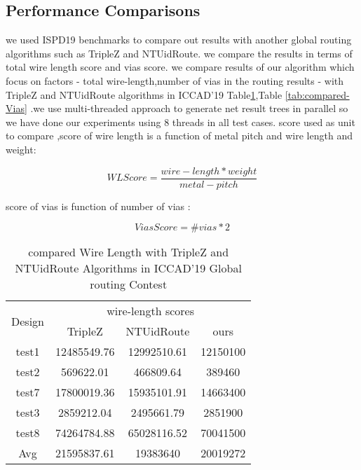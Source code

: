 \documentclass[conference]{IEEEtran}
\begin{document}
\subsection{Performance Comparisons}

we used ISPD19 benchmarks to compare out results with another global
routing algorithms such as TripleZ and NTUidRoute. we compare the
results in terms of total wire length score and vias score. we compare
results of our algorithm which focus on factors - total wire-length,number
of vias in the routing results - with TripleZ and NTUidRoute algorithms
in ICCAD'19 Table\ref{tab:compared-Wire-Lengh},Table \ref{tab:compared-Vias}
.we use multi-threaded approach to generate net result trees in parallel
so we have done our experiments using 8 threads in all test cases.
score used as unit to compare ,score of wire length is a function
of metal pitch and wire length and weight:

\[
WLScore=\frac{wire-length*weight}{metal-pitch}
\]

score of vias is function of number of vias :

\[
ViasScore=\#vias*2
\]

{\tiny{}}
\begin{table}
{\tiny{}\caption{\label{tab:compared-Wire-Lengh}compared Wire Length with TripleZ and
NTUidRoute Algorithms in ICCAD'19 Global routing Contest }
}{\tiny\par}
\centering{}{\footnotesize{}}%
\begin{tabular}{|c|c|c|c|}
\hline 
\multirow{2}{*}{{\footnotesize{}Design}} & \multicolumn{3}{c|}{{\footnotesize{}wire-length scores}}\tabularnewline
\cline{2-4} \cline{3-4} \cline{4-4} 
 & {\footnotesize{}TripleZ} & {\footnotesize{}NTUidRoute} & {\footnotesize{}ours}\tabularnewline
\hline 
{\footnotesize{}test1} & {\footnotesize{}12485549.76} & {\footnotesize{}12992510.61} & {\footnotesize{}12150100}\tabularnewline
\hline 
{\footnotesize{}test2} & {\footnotesize{}569622.01} & {\footnotesize{}466809.64} & {\footnotesize{}389460}\tabularnewline
\hline 
{\footnotesize{}test7} & {\footnotesize{}17800019.36} & {\footnotesize{}15935101.91} & {\footnotesize{}14663400}\tabularnewline
\hline 
{\footnotesize{}test3} & {\footnotesize{}2859212.04} & {\footnotesize{}2495661.79} & {\footnotesize{}2851900}\tabularnewline
\hline 
{\footnotesize{}test8} & {\footnotesize{}74264784.88} & {\footnotesize{}65028116.52} & {\footnotesize{}70041500}\tabularnewline
\hline 
{\footnotesize{}Avg} & {\footnotesize{}21595837.61} & {\footnotesize{}19383640} & {\footnotesize{}20019272}\tabularnewline
\hline 
\end{tabular}{\footnotesize\par}
\end{table}
{\tiny\par}
\end{document}
